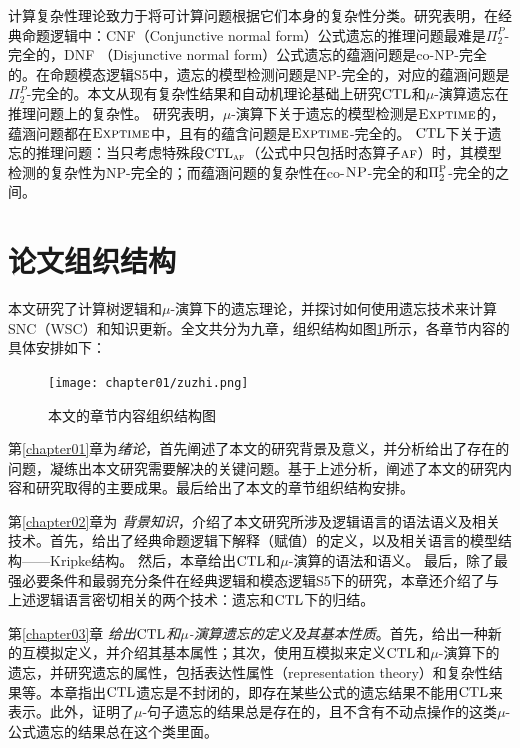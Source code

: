 计算复杂性理论致力于将可计算问题根据它们本身的复杂性分类。研究表明，在经典命题逻辑中：CNF（Conjunctive normal form）公式遗忘的推理问题最难是$\Pi_2^P$-完全的，DNF （Disjunctive normal form）公式遗忘的蕴涵问题是co-NP-完全的。在命题模态逻辑S5中，遗忘的模型检测问题是NP-完全的，对应的蕴涵问题是$\Pi_2^P$-完全的。本文从现有复杂性结果和自动机理论基础上研究$\textrm{CTL}$和$\mu$-演算遗忘在推理问题上的复杂性。
研究表明，$\mu$-演算下关于遗忘的模型检测是$\textsc{Exptime}$的，蕴涵问题都在$\textsc{Exptime}$中，且有的蕴含问题是$\textsc{Exptime}$-完全的。
$\textrm{CTL}$下关于遗忘的推理问题：当只考虑特殊段$\textrm{CTL}_{\textsc{a} \textsc{f}}$（公式中只包括时态算子$\textsc{a} \textsc{f}$）时，其模型检测的复杂性为\textsc{NP}-完全的；而蕴涵问题的复杂性在co-$\textsc{NP}$-完全的和$\Pi_2^{\textsc{P}}$-完全的之间。








\section{论文组织结构}
本文研究了计算树逻辑和$\mu$-演算下的遗忘理论，并探讨如何使用遗忘技术来计算SNC（WSC）和知识更新。全文共分为九章，组织结构如图\ref{fig:chapter1-research-structure}所示，各章节内容的具体安排如下：


\begin{figure}[htbp]
	\centering
	\texttt{[image: chapter01/zuzhi.png]}
	\caption{本文的章节内容组织结构图}
	\label{fig:chapter1-research-structure}
\end{figure}

第\ref{chapter01}章为\textit{绪论}，首先阐述了本文的研究背景及意义，并分析给出了存在的问题，凝练出本文研究需要解决的关键问题。基于上述分析，阐述了本文的研究内容和研究取得的主要成果。最后给出了本文的章节组织结构安排。


第\ref{chapter02}章为 {\em 背景知识}，介绍了本文研究所涉及逻辑语言的语法语义及相关技术。首先，给出了经典命题逻辑下解释（赋值）的定义，以及相关语言的模型结构——Kripke结构。
然后，本章给出$\textrm{CTL}$和$\mu$-演算的语法和语义。
最后，除了最强必要条件和最弱充分条件在经典逻辑和模态逻辑S5下的研究，本章还介绍了与上述逻辑语言密切相关的两个技术：遗忘和$\textrm{CTL}$下的归结。



第\ref{chapter03}章 {\em 给出$\textrm{CTL}$和$\mu$-演算遗忘的定义及其基本性质}。首先，给出一种新的互模拟定义，并介绍其基本属性；其次，使用互模拟来定义$\textrm{CTL}$和$\mu$-演算下的遗忘，并研究遗忘的属性，包括表达性属性（representation theory）和复杂性结果等。本章指出$\textrm{CTL}$遗忘是不封闭的，即存在某些公式的遗忘结果不能用$\textrm{CTL}$来表示。此外，证明了$\mu$-句子遗忘的结果总是存在的，且不含有不动点操作的这类$\mu$-公式遗忘的结果总在这个类里面。

